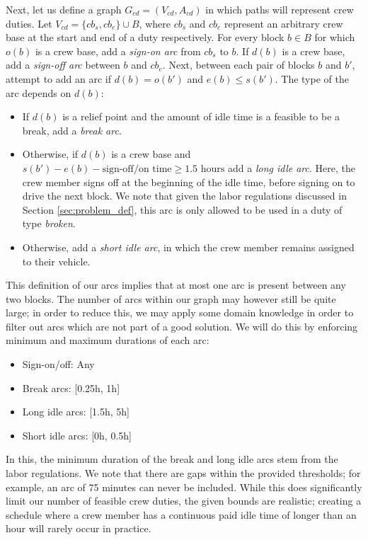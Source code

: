 \documentclass[]{article}
\begin{document}
Next, let us define a graph $G_{cd} = (V_{cd}, A_{cd})$ in which paths will represent crew duties. Let $V_{cd} = \{ cb_s, cb_e \} \cup B$, where $cb_s$ and $cb_e$ represent an arbitrary crew base at the start and end of a duty respectively. For every block $b \in B$ for which $o(b)$ is a crew base, add a \textit{sign-on arc} from $cb_s$ to $b$. If $d(b)$ is a crew base, add a \textit{sign-off arc} between $b$ and $cb_e$. Next, between each pair of blocks $b$ and $b'$, attempt to add an arc if $d(b) = o(b')$ and $e(b) \leq s(b')$. The type of the arc depends on $d(b)$:
\begin{itemize}
  \item If $d(b)$ is a relief point and the amount of idle time is a feasible to be a break, add a \textit{break arc}.
  \item Otherwise, if $d(b)$ is a crew base and $s(b') - e(b) - \text{sign-off/on time} \geq 1.5\text{ hours}$ add a \textit{long idle arc}. Here, the crew member signs off at the beginning of the idle time, before signing on to drive the next block. We note that given the labor regulations discussed in Section \ref{sec:problem_def}, this arc is only allowed to be used in a duty of type \textit{broken}.
  \item Otherwise, add a \textit{short idle arc}, in which the crew member remains assigned to their vehicle. 
\end{itemize}
This definition of our arcs implies that at most one arc is present between any two blocks. The number of arcs within our graph may however still be quite large; in order to reduce this, we may apply some domain knowledge in order to filter out arcs which are not part of a good solution. We will do this by enforcing minimum and maximum durations of each arc:
\begin{itemize}
  \item Sign-on/off: Any
  \item Break arcs: [0.25h, 1h]
  \item Long idle arcs: [1.5h, 5h]
  \item Short idle arcs: [0h, 0.5h]
\end{itemize} 
In this, the minimum duration of the break and long idle arcs stem from the labor regulations. We note that there are gaps within the provided thresholds; for example, an arc of 75 minutes can never be included. While this does significantly limit our number of feasible crew duties, the given bounds are realistic; creating a schedule where a crew member has a continuous paid idle time of longer than an hour will rarely occur in practice.
\end{document}
